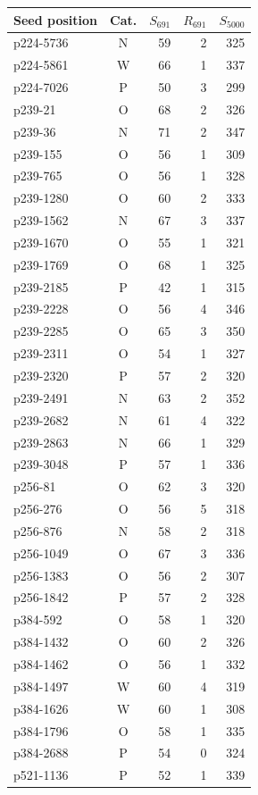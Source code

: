 \hfill
\begin{minipage}[t]{0.48\linewidth}\centering
\begin{tabular}{lcrrr}\toprule
Seed position & Cat. & $S_{691}$ & $R_{691}$ & $S_{5000}$\\\midrule
p224-5736 & N & 59 & 2 & 325\\
p224-5861 & W & 66 & 1 & 337\\
p224-7026 & P & 50 & 3 & 299\\
p239-21 & O & 68 & 2 & 326\\
p239-36 & N & 71 & 2 & 347\\
p239-155 & O & 56 & 1 & 309\\
p239-765 & O & 56 & 1 & 328\\
p239-1280 & O & 60 & 2 & 333\\
p239-1562 & N & 67 & 3 & 337\\
p239-1670 & O & 55 & 1 & 321\\
p239-1769 & O & 68 & 1 & 325\\
p239-2185 & P & 42 & 1 & 315\\
p239-2228 & O & 56 & 4 & 346\\
p239-2285 & O & 65 & 3 & 350\\
p239-2311 & O & 54 & 1 & 327\\
p239-2320 & P & 57 & 2 & 320\\
p239-2491 & N & 63 & 2 & 352\\
p239-2682 & N & 61 & 4 & 322\\
p239-2863 & N & 66 & 1 & 329\\
p239-3048 & P & 57 & 1 & 336\\
p256-81 & O & 62 & 3 & 320\\
p256-276 & O & 56 & 5 & 318\\
p256-876 & N & 58 & 2 & 318\\
p256-1049 & O & 67 & 3 & 336\\
p256-1383 & O & 56 & 2 & 307\\
p256-1842 & P & 57 & 2 & 328\\
p384-592 & O & 58 & 1 & 320\\
p384-1432 & O & 60 & 2 & 326\\
p384-1462 & O & 56 & 1 & 332\\
p384-1497 & W & 60 & 4 & 319\\
p384-1626 & W & 60 & 1 & 308\\
p384-1796 & O & 58 & 1 & 335\\
p384-2688 & P & 54 & 0 & 324\\
p521-1136 & P & 52 & 1 & 339\\
\bottomrule\end{tabular}\end{minipage}
